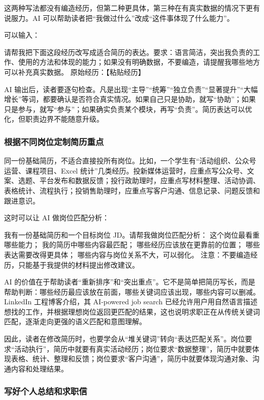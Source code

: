 这两种写法都没有编造经历，但第二种更具体，第三种在有真实数据的情况下更有说服力。AI 可以帮助读者把“我做过什么”改成“这件事体现了什么能力”。

可以输入：

\begin{tcolorbox}[promptbox]
请帮我把下面这段经历改写成适合简历的表达。要求：语言简洁，突出我负责的工作、使用的方法和体现的能力；如果没有明确数据，不要编造，请提醒我哪些地方可以补充真实数据。
原始经历：【粘贴经历】
\end{tcolorbox}

AI 输出后，读者要逐句检查。凡是出现“主导”“统筹”“独立负责”“显著提升”“大幅增长”等词，都要确认是否符合真实情况。如果自己只是协助，就写“协助”；如果只是参与，就写“参与”；如果确实负责某个模块，再写“负责”。简历表达可以优化，但职责边界不能随意升级。

\subsubsection*{根据不同岗位定制简历重点}

同一份基础简历，不适合直接投所有岗位。比如，一个学生有“活动组织、公众号运营、课程项目、Excel 统计”几类经历。投新媒体运营时，应重点写公众号、文案、选题、平台发布和数据反馈；投行政助理时，应重点写材料整理、活动协调、表格统计、流程执行；投销售助理时，应重点写客户沟通、信息记录、问题反馈和跟进意识。

这时可以让 AI 做岗位匹配分析：

\begin{tcolorbox}[promptbox]
我有一份基础简历和一个目标岗位 JD。请帮我做岗位匹配分析：
这个岗位最看重哪些能力；
我的简历中哪些内容最匹配；
哪些经历应该放在更靠前的位置；
哪些表达需要改得更具体；
哪些内容与岗位关系不大，可以弱化。
注意：不要编造经历，只能基于我提供的材料提出修改建议。
\end{tcolorbox}

AI 的价值在于帮助读者“重新排序”和“突出重点”。它不是简单把简历写长，而是帮助判断：哪些经历最应该放在前面，哪些关键词应该出现，哪些内容可以删减。LinkedIn 工程博客介绍，其 AI-powered job search 已经允许用户用自然语言描述想找的工作，并根据理想岗位返回更匹配的结果，这也说明求职正在从传统关键词匹配，逐渐走向更强的语义匹配和意图理解。

因此，读者在修改简历时，也要学会从“堆关键词”转向“表达匹配关系”。岗位要求“活动执行”，简历中就要有真实活动经历；岗位要求“数据整理”，简历中就要体现表格、统计、整理和反馈；岗位要求“客户沟通”，简历中就要体现沟通对象、沟通内容和处理结果。

\subsubsection*{写好个人总结和求职信}

